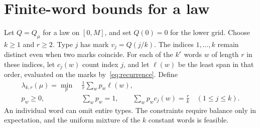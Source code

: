 \section{Finite-word bounds for a law}\label{sec:lp}

Let $Q=Q_\mu$ for a law on $[0,M]$, and set $Q(0)=0$ for the lower
grid. Choose $k\ge1$ and $r\ge2$. Type $j$ has mark $v_j=Q(j/k)$.
The indices $1,\ldots,k$ remain distinct even when two marks coincide.
For each of the $k^r$ words $w$ of length $r$ in these indices, let
$c_j(w)$ count index $j$, and let $\ell(w)$ be the least span in that
order, evaluated on the marks by~\eqref{eq:recurrence}. Define
\begin{equation}\label{eq:lp}
\begin{split}
 \lambda_{k,r}(\mu)=\min_p\ &\frac1r\sum_w p_w\ell(w),\\
 p_w\ge0,\quad &\sum_w p_w=1,\qquad
 \sum_w p_wc_j(w)=\frac rk\quad(1\le j\le k).
\end{split}
\end{equation}
An individual word can omit entire types. The constraints require balance
only in expectation, and the uniform mixture of the $k$ constant words
is feasible.

